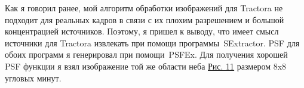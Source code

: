\documentclass[12pt,a4paper]{article}
\begin{document}
Как я говорил ранее, мой алгоритм обработки изображений для Tractora не подходит для реальных кадров в связи с их плохим разрешением и большой концентрацией источников. Поэтому, я пришел к выводу, что имеет смысл источники для Tractora извлекать при помощи программы~SExtractor. PSF для обоих программ я генерировал при помощи~PSFEx. Для получения хорошей PSF функции я взял изображение той же области неба \hyperref[pic11]{Рис. 11}  размером 8x8 угловых минут.

\begin{figure}[h]
    \begin{minipage}{0.45\textwidth}
    \end{minipage} 
    \hfill
    \begin{minipage}{0.45\textwidth}

\end{minipage}
\end{figure}
\end{document}
